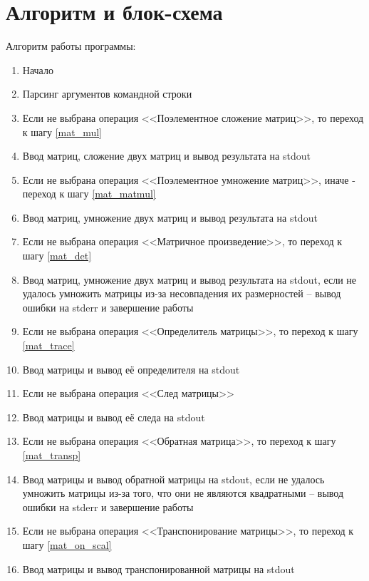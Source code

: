 \documentclass[a4paper,14pt]{extarticle}
\begin{document}
\newpage

\section{Алгоритм и блок-схема}
Алгоритм работы программы:
\begin{enumerate}
\item Начало
\item Парсинг аргументов командной строки
	
\item Если не выбрана операция <<Поэлементное сложение матриц>>, то переход к шагу \ref{mat_mul}
\item Ввод матриц, сложение двух матриц и вывод результата на stdout
	
\item \label{mat_mul} 
Если не выбрана операция <<Поэлементное умножение матриц>>, 
иначе - переход к шагу \ref{mat_matmul}
\item Ввод матриц, умножение двух матриц и вывод результата на stdout
	
\item \label{mat_matmul} 
Если не выбрана операция <<Матричное произведение>>, то переход к шагу \ref{mat_det} 
\item Ввод матриц, умножение двух матриц и вывод результата на stdout, 
если не удалось умножить матрицы 
из-за несовпадения их размерностей -- вывод ошибки на stderr и завершение работы
	
\item \label{mat_det} 
Если не выбрана операция <<Определитель матрицы>>, то переход к шагу \ref{mat_trace}
\item Ввод матрицы и вывод её определителя на stdout
	
\item \label{mat_trace} Если не выбрана операция <<След матрицы>> 
\item Ввод матрицы и вывод её следа на stdout
	
\item \label{mat_reverse} 
Если не выбрана операция <<Обратная матрица>>, то переход к шагу \ref{mat_transp}	
\item Ввод матрицы и вывод обратной матрицы на stdout, 
если не удалось умножить матрицы из-за того, что они не являются
квадратными -- вывод ошибки на stderr и завершение работы
	
\item \label{mat_transp} 
Если не выбрана операция <<Транспонирование матрицы>>, то переход к шагу \ref{mat_on_scal}
\item Ввод матрицы и вывод транспонированной матрицы на stdout	
	

\end{enumerate}
\end{document}
